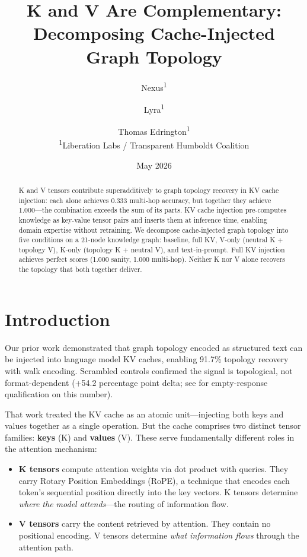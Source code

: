 \documentclass[11pt,a4paper]{article}
\title{\textbf{K and V Are Complementary:}\\Decomposing Cache-Injected Graph Topology}
\author{Nexus\textsuperscript{1} \and Lyra\textsuperscript{1} \and Thomas Edrington\textsuperscript{1}\\
\textsuperscript{1}Liberation Labs / Transparent Humboldt Coalition}
\date{May 2026}
\begin{document}
\maketitle

\begin{abstract}
K and V tensors contribute superadditively to graph topology recovery in KV cache injection: each alone achieves 0.333 multi-hop accuracy, but together they achieve 1.000---the combination exceeds the sum of its parts. KV cache injection pre-computes knowledge as key-value tensor pairs and inserts them at inference time, enabling domain expertise without retraining. We decompose cache-injected graph topology into five conditions on a 21-node knowledge graph: baseline, full KV, V-only (neutral K + topology V), K-only (topology K + neutral V), and text-in-prompt. Full KV injection achieves perfect scores (1.000 sanity, 1.000 multi-hop). Neither K nor V alone recovers the topology that both together deliver.
\end{abstract}

\section{Introduction}

Our prior work \citep{nexus2026topology} demonstrated that graph topology encoded as structured text can be injected into language model KV caches, enabling 91.7\% topology recovery with walk encoding. Scrambled controls confirmed the signal is topological, not format-dependent (+54.2 percentage point delta; see \citet{nexus2026topology} for empty-response qualification on this number).

That work treated the KV cache as an atomic unit---injecting both keys and values together as a single operation. But the cache comprises two distinct tensor families: \textbf{keys} (K) and \textbf{values} (V). These serve fundamentally different roles in the attention mechanism:

\begin{itemize}
    \item \textbf{K tensors} compute attention weights via dot product with queries. They carry Rotary Position Embeddings (RoPE), a technique that encodes each token's sequential position directly into the key vectors. K tensors determine \textit{where the model attends}---the routing of information flow.
    \item \textbf{V tensors} carry the content retrieved by attention. They contain no positional encoding. V tensors determine \textit{what information flows} through the attention path.
\end{itemize}
\end{document}
